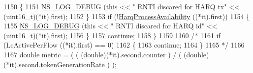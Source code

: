 \begin{DoxyCode}
1150             \{
1151               \hyperlink{group__logging_ga413f1886406d49f59a6a0a89b77b4d0a}{NS\_LOG\_DEBUG} (\textcolor{keyword}{this} << \textcolor{stringliteral}{" RNTI discared for HARQ tx"} << (uint16\_t)(*it).first);
1152             \}
1153           \textcolor{keywordflow}{if} (!\hyperlink{classns3_1_1TdTbfqFfMacScheduler_a6df3d860dc847dfa118d87b4a3679c7e}{HarqProcessAvailability} ((*it).first))
1154             \{
1155               \hyperlink{group__logging_ga413f1886406d49f59a6a0a89b77b4d0a}{NS\_LOG\_DEBUG} (\textcolor{keyword}{this} << \textcolor{stringliteral}{" RNTI discared for HARQ id"} << (uint16\_t)(*it).first);
1156             \}
1157           \textcolor{keywordflow}{continue};
1158        \}
1159 
1160       \textcolor{comment}{/*}
1161 \textcolor{comment}{      if (LcActivePerFlow ((*it).first) == 0)}
1162 \textcolor{comment}{        \{}
1163 \textcolor{comment}{          continue;  }
1164 \textcolor{comment}{        \}}
1165 \textcolor{comment}{      */}
1166 
1167       \textcolor{keywordtype}{double} metric = ( ( (double)(*it).second.counter ) / ( (double)(*it).second.tokenGenerationRate ) ); 
       

\end{DoxyCode}
